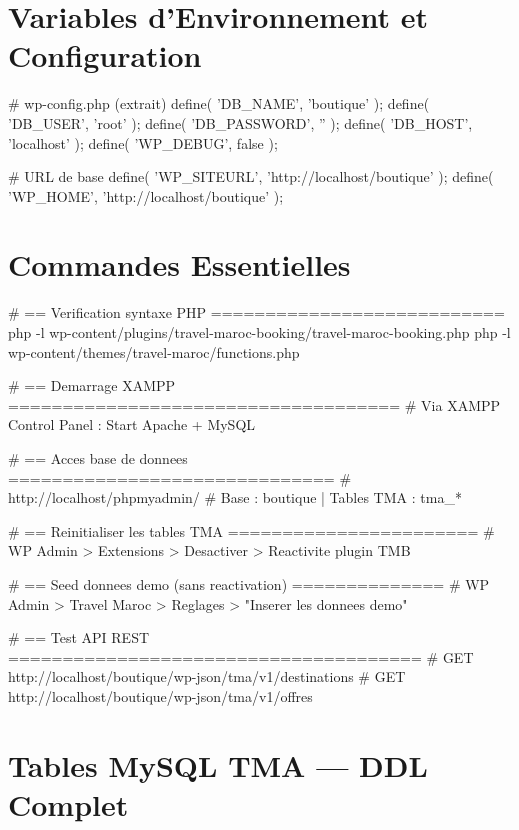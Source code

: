 \documentclass[12pt,a4paper]{report}
\begin{document}
\chapter{Variables d'Environnement et Configuration}

\begin{shellbox}
# wp-config.php (extrait)
define( 'DB_NAME',     'boutique' );
define( 'DB_USER',     'root' );
define( 'DB_PASSWORD', '' );
define( 'DB_HOST',     'localhost' );
define( 'WP_DEBUG',    false );

# URL de base
define( 'WP_SITEURL', 'http://localhost/boutique' );
define( 'WP_HOME',    'http://localhost/boutique' );
\end{shellbox}

\chapter{Commandes Essentielles}

\begin{shellbox}
# == Verification syntaxe PHP ===========================
php -l wp-content/plugins/travel-maroc-booking/travel-maroc-booking.php
php -l wp-content/themes/travel-maroc/functions.php

# == Demarrage XAMPP ====================================
# Via XAMPP Control Panel : Start Apache + MySQL

# == Acces base de donnees ==============================
# http://localhost/phpmyadmin/
# Base : boutique | Tables TMA : tma_*

# == Reinitialiser les tables TMA =======================
# WP Admin > Extensions > Desactiver > Reactivite plugin TMB

# == Seed donnees demo (sans reactivation) ==============
# WP Admin > Travel Maroc > Reglages > "Inserer les donnees demo"

# == Test API REST ======================================
# GET http://localhost/boutique/wp-json/tma/v1/destinations
# GET http://localhost/boutique/wp-json/tma/v1/offres
\end{shellbox}

\chapter{Tables MySQL TMA --- DDL Complet}
\end{document}
